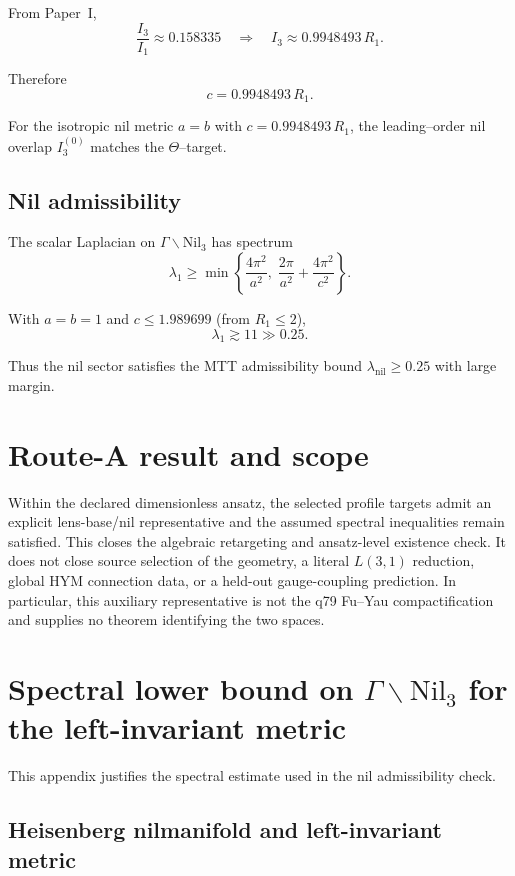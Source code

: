\documentclass[11pt]{article}
\begin{document}
From Paper~I,
\[
\frac{I_3}{I_1}\approx 0.158335
\quad\Rightarrow\quad
I_3 \approx 0.9948493\,R_1.
\]

Therefore
\[
\boxed{c = 0.9948493\,R_1.}
\]

\begin{proposition}
For the isotropic nil metric $a=b$ with $c=0.9948493\,R_1$,
the leading--order nil overlap $I_3^{(0)}$ matches the $\Theta$--target.
\end{proposition}

\subsection{Nil admissibility}

The scalar Laplacian on $\Gamma\backslash\mathrm{Nil}_3$ has spectrum
\[
\lambda_1 \ge \min\left\{\frac{4\pi^2}{a^2},
\;\frac{2\pi}{a^2}+\frac{4\pi^2}{c^2}\right\}.
\]

With $a=b=1$ and $c\le 1.989699$ (from $R_1\le 2$),
\[
\lambda_1 \gtrsim 11 \gg 0.25.
\]

Thus the nil sector satisfies the MTT admissibility bound
$\lambda_{\mathrm{nil}}\ge 0.25$ with large margin.


\section{Route-A result and scope}

Within the declared dimensionless ansatz, the selected profile targets admit
an explicit lens-base/nil representative and the assumed spectral inequalities
remain satisfied.  This closes the algebraic retargeting and ansatz-level
existence check.  It does not close source selection of the geometry, a literal
$L(3,1)$ reduction, global HYM connection data, or a held-out gauge-coupling
prediction. In particular, this auxiliary representative is not the q79
Fu--Yau compactification and supplies no theorem identifying the two spaces.

\appendix
\section{Spectral lower bound on $\Gamma\backslash\mathrm{Nil}_3$ for the left-invariant metric}

This appendix justifies the spectral estimate used in the nil admissibility check.

\subsection{Heisenberg nilmanifold and left-invariant metric}
\end{document}
